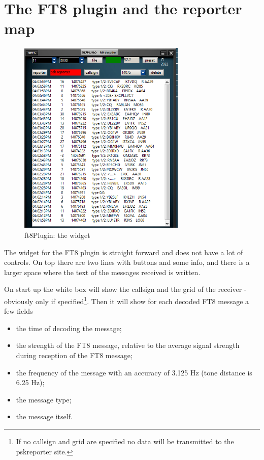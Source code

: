 \documentclass[11pt]{article}
\begin{document}
\section{The FT8 plugin and the reporter map}
\begin{figure}[htp]
\centering
\includegraphics[width=80mm]{ft8-widget.png}
\caption{ft8Plugin: the widget}
\label{figure:ft8_widget}
\end{figure}
\par
The widget for the FT8 plugin is straight forward and does not have a lot
of controls.
On top there are two lines with buttons and some info,
and there is a larger space where the text of the messages received is written.
\par
On start up the white box will show the callsign and the grid of the
receiver - obviously only if specified\footnote{If no callsign and grid are
specified no data will be transmitted to the pskreporter site.}.
Then it will show for each decoded FT8 message a few fields
\begin{itemize}
\item
the time of decoding the message;
\item
the strength of the FT8 message, relative to the average signal
strength during reception of the FT8 message;
\item the frequency of the message with an accuracy of 3.125 Hz (tone
distance is 6.25 Hz);
\item the message type;
\item the message itself.
\end{itemize}
\end{document}
